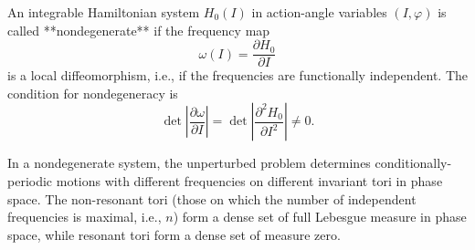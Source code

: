 An integrable Hamiltonian system $H_0(I)$ in action-angle variables $(I, \varphi)$ is called **nondegenerate** if the frequency map
$$\omega(I) = \frac{\partial H_0}{\partial I}$$
is a local diffeomorphism, i.e., if the frequencies are functionally independent. The condition for nondegeneracy is
$$\det\left| \frac{\partial \omega}{\partial I} \right| = \det\left| \frac{\partial^2 H_0}{\partial I^2} \right| \neq 0.$$

In a nondegenerate system, the unperturbed problem determines conditionally-periodic motions with different frequencies on different invariant tori in phase space. The non-resonant tori (those on which the number of independent frequencies is maximal, i.e., $n$) form a dense set of full Lebesgue measure in phase space, while resonant tori form a dense set of measure zero.
